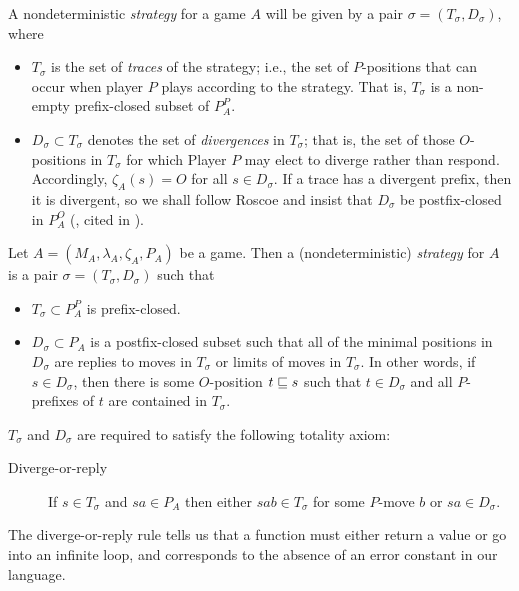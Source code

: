 \documentclass{article}
\begin{document}
A nondeterministic \emph{strategy} for a game $A$ will be given by a pair $\sigma=(T_\sigma, D_\sigma)$, where
\begin{itemize}
  \item $T_\sigma$ is the set of \emph{traces} of the strategy; i.e., the set of $P$-positions that can occur when player $P$ plays according to the strategy.  That is, $T_\sigma$ is a non-empty prefix-closed subset of $P_A^P$.  

  \item $D_\sigma\subset T_\sigma$ denotes the set of \emph{divergences} in $T_\sigma$; that is, the set of those $O$-positions in $T_\sigma$ for which Player $P$ may elect to diverge rather than respond.  Accordingly, $\zeta_A(s)=O$ for all $s\in D_\sigma$.  If a trace has a divergent prefix, then it is divergent, so we shall follow Roscoe and insist that $D_\sigma$ be postfix-closed in $P_A^O$ (\cite{RoscoeCspInfinite}, cited in \cite{mcCHFiniteND}).
\end{itemize}

\begin{definition}
  Let $A=(M_A,\lambda_A,\zeta_A,P_A)$ be a game.  Then a (nondeterministic) \emph{strategy} for $A$ is a pair $\sigma=(T_\sigma,D_\sigma)$ such that
  \begin{itemize}
    \item $T_\sigma\subset P_A^P$ is prefix-closed.
    \item $D_\sigma\subset P_A$ is a postfix-closed subset such that all of the minimal positions in $D_\sigma$ are replies to moves in $T_\sigma$ or limits of moves in $T_\sigma$.  In other words, if $s\in D_\sigma$, then there is some $O$-position $t\sqsubseteq s$ such that $t\in D_\sigma$ and all $P$-prefixes of $t$ are contained in $T_\sigma$.
  \end{itemize}

  $T_\sigma$ and $D_\sigma$ are required to satisfy the following totality axiom:
  \begin{description}
    \item[Diverge-or-reply] If $s\in T_\sigma$ and $sa\in P_A$ then either $sab\in T_\sigma$ for some $P$-move $b$ or $sa\in D_\sigma$.  
  \end{description}

  The diverge-or-reply rule tells us that a function must either return a value or go into an infinite loop, and corresponds to the absence of an error constant in our language.  
\end{definition}
\end{document}
